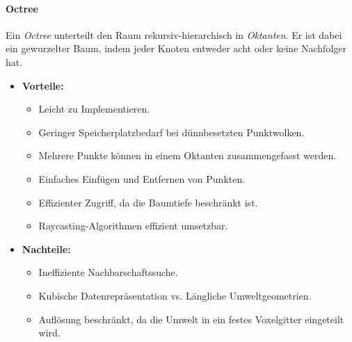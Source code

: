 				\paragraph{Octree}
					Ein \emph{Octree} unterteilt den Raum rekursiv-hierarchisch in \emph{Oktanten}. Er ist dabei ein gewurzelter Baum, indem jeder Knoten entweder acht oder keine Nachfolger hat.
					
					\begin{itemize}
						\item \textbf{Vorteile:}
							\begin{itemize}
								\item Leicht zu Implementieren.
								\item Geringer Speicherplatzbedarf bei dünnbesetzten Punktwolken.
								\item Mehrere Punkte können in einem Oktanten zusammengefasst werden.
								\item Einfaches Einfügen und Entfernen von Punkten.
								\item Effizienter Zugriff, da die Baumtiefe beschränkt ist.
								\item Raycasting-Algorithmen effizient umsetzbar.
							\end{itemize}
						\item \textbf{Nachteile:}
							\begin{itemize}
								\item Ineffiziente Nachbarschaftssuche.
								\item Kubische Datenrepräsentation vs. Längliche Umweltgeometrien.
								\item Auflösung beschränkt, da die Umwelt in ein festes Voxelgitter eingeteilt wird.
							\end{itemize}
					\end{itemize}


